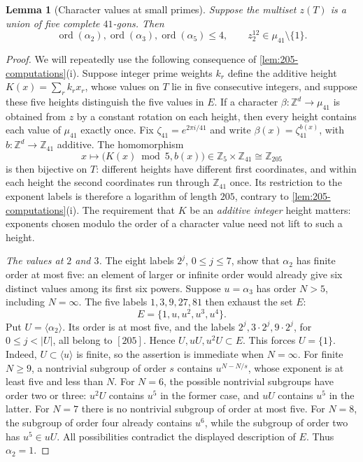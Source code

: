 \documentclass[10pt,a4paper]{amsart}
\newtheorem{lemma}{Lemma}
\newcommand{\Z}{\mathbb Z}
\begin{document}
\begin{lemma}[Character values at small primes]\label{lem:205-phases}
Suppose the multiset $z(T)$ is a union of five complete $41$-gons.
Then
\[
 \operatorname{ord}(\alpha_2),\operatorname{ord}(\alpha_3),
 \operatorname{ord}(\alpha_5)\le4,
 \qquad z_2^{12}\in\mu_{41}\setminus\{1\}.
\]
\end{lemma}

\begin{proof}
We will repeatedly use the following consequence of
\cref{lem:205-computations}(i).
Suppose integer prime weights $k_r$ define the additive height
$K(x)=\sum_r k_rx_r$, whose values on $T$ lie in five consecutive
integers, and suppose these five heights distinguish the five values in $E$.
If a character $\beta:\Z^d\to\mu_{41}$ is obtained from $z$ by a
constant rotation on each height, then every height contains
each value of $\mu_{41}$ exactly once. Fix
$\zeta_{41}=e^{2\pi i/41}$ and write
$\beta(x)=\zeta_{41}^{b(x)}$, with $b:\Z^d\to\Z_{41}$ additive.
The homomorphism
\begin{equation}\label{eq:205-height-logarithm}
 x\longmapsto \bigl(K(x)\bmod5,b(x)\bigr)
       \in\Z_5\times\Z_{41}\cong\Z_{205}
\end{equation}
is then bijective on $T$: different heights have different first
coordinates, and within each height the second coordinates run through
$\Z_{41}$ once. Its restriction to the exponent labels is therefore
a logarithm of length $205$, contrary to
\cref{lem:205-computations}(i). The requirement that $K$ be an
\emph{additive integer} height matters: exponents chosen modulo the
order of a character value need not lift to such a height.

\smallskip\noindent
\emph{The values at $2$ and $3$.}
The eight labels $2^j$, $0\le j\le7$, show that $\alpha_2$ has finite order
at most five: an element of larger or infinite order would already
give six distinct values among its first six powers.
Suppose $u=\alpha_3$ has order $N>5$, including $N=\infty$.
The five labels $1,3,9,27,81$ then exhaust the set $E$:
\[
 E=\{1,u,u^2,u^3,u^4\}.
\]
Put $U=\langle\alpha_2\rangle$. Its order is at most five, and
the labels $2^j,3\cdot2^j,9\cdot2^j$, for $0\le j<|U|$, all
belong to $[205]$. Hence $U,uU,u^2U\subset E$.
This forces $U=\{1\}$. Indeed, $U\subset\langle u\rangle$ is
finite, so the assertion is immediate when $N=\infty$. For finite
$N\ge9$, a nontrivial subgroup of order $s$ contains
$u^{N-N/s}$, whose exponent is at least five and less than $N$.
For $N=6$, the possible nontrivial subgroups have order two or three:
$u^2U$ contains $u^5$ in the former case, and $uU$ contains $u^5$
in the latter. For $N=7$ there is no nontrivial subgroup of order at
most five. For $N=8$, the subgroup of order four already contains
$u^6$, while the subgroup of order two has $u^5\in uU$.
All possibilities contradict the displayed description of $E$.
Thus $\alpha_2=1$.


\end{proof}
\end{document}
